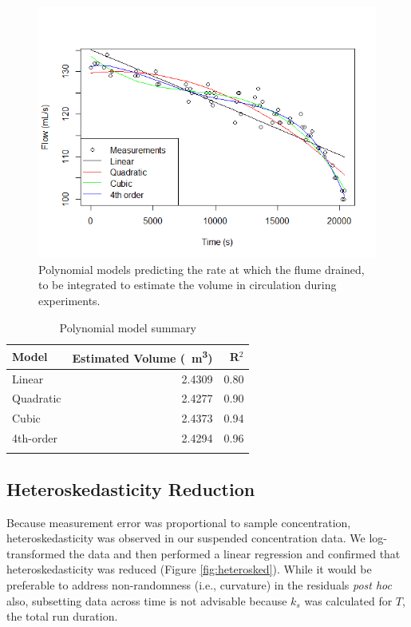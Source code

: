 \documentclass[geosciences,article,submit,moreauthors,pdftex]{Definitions/mdpi}
\begin{document}
\begin{figure}[H]
\centering
\includegraphics[width=5in]{../pics/flumevol.png}
\caption{Polynomial models predicting the rate at which the flume drained, to be integrated to estimate the volume in circulation during experiments.}
\label{fig:flumevol}
\end{figure}

\begin{table}[H]
\caption{Polynomial model summary}
\centering
\begin{tabular}{lrr}
\toprule
\textbf{Model}&\textbf{Estimated Volume (\SI{}{\metre\cubed})}&\textbf{R$^2$}\\
\midrule
Linear       &  2.4309     &   0.80\\
Quadratic    &  2.4277     &   0.90\\
Cubic        &  2.4373     &   0.94\\
4th-order    &  2.4294     &   0.96\\
\bottomrule
\label{tbl:flumevol}
\end{tabular}
\end{table}

\subsection{Heteroskedasticity Reduction}

Because measurement error was proportional to sample concentration, heteroskedasticity was observed in our suspended concentration data. We log-transformed the data and then performed a linear regression and confirmed that heteroskedasticity was reduced (Figure \ref{fig:heterosked}). While it would be preferable to address non-randomness (i.e., curvature) in the residuals \textit{post hoc} also, subsetting data across time is not advisable because $k_s$ was calculated for $T$, the total run duration.
\end{document}
